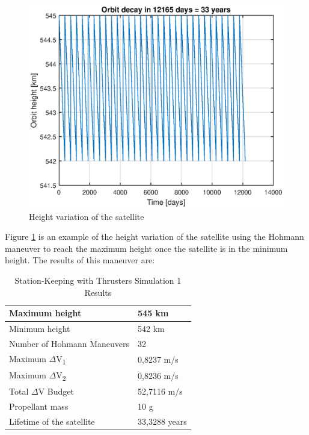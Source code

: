 \begin{figure}[h]
\centerline{\includegraphics[scale=1]{ThrustersDrag/thrust3km.eps}}
\caption{Height variation of the satellite}
\label{fig:hohmann3km}
\end{figure}

Figure \ref{fig:hohmann3km} is an example of the height variation of the satellite using the Hohmann maneuver to reach the maximum height once the satellite is in the minimum height. The results of this maneuver are:

\begin{table}
\begin{center}
\begin{tabular}{ | l | l | }
\hline
Maximum height & 545 km \\
\hline
Minimum height & 542 km \\
\hline
Number of Hohmann Maneuvers & 32 \\
\hline
Maximum $\Delta$V\textsubscript{1} & 0,8237 m/s \\
\hline
Maximum $\Delta$V\textsubscript{2} & 0,8236 m/s \\
\hline
Total $\Delta$V Budget & 52,7116 m/s \\ 
\hline 
Propellant mass & 10 g \\
\hline
Lifetime of the satellite & 33,3288 years \\
\hline
\end{tabular}
\caption{Station-Keeping with Thrusters Simulation 1 Results}
\end{center}
\end{table}

